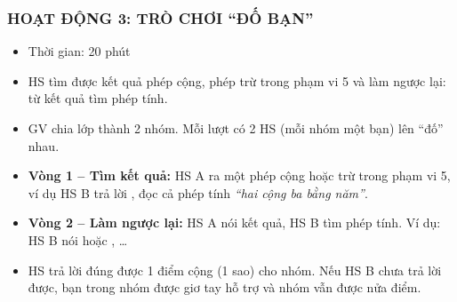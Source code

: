 \documentclass[../main.tex]{subfiles}
\begin{document}
\subsubsection{HOẠT ĐỘNG 3: TRÒ CHƠI “ĐỐ BẠN”}
\begin{hd}
    \begin{itemize}
        \item Thời gian: 20 phút
        \item HS tìm được kết quả phép cộng, phép trừ trong phạm vi 5 và làm ngược lại: từ kết quả tìm phép tính.
    \end{itemize}
\end{hd}
\begin{itemize}
    \item GV chia lớp thành 2 nhóm. Mỗi lượt có 2 HS (mỗi nhóm một bạn) lên “đố” nhau.
    \item \textbf{Vòng 1 -- Tìm kết quả:} HS A ra một phép cộng hoặc trừ trong phạm vi 5, ví dụ  HS B trả lời , đọc cả phép tính \textit{“hai cộng ba bằng năm”}.
    \item \textbf{Vòng 2 -- Làm ngược lại:} HS A nói kết quả, HS B tìm phép tính. Ví dụ:  HS B nói  hoặc , \dots
    \item HS trả lời đúng được 1 điểm cộng (1 sao) cho nhóm. Nếu HS B chưa trả lời được, bạn trong nhóm được giơ tay hỗ trợ và nhóm vẫn được nửa điểm.
\end{itemize}
\end{document}
